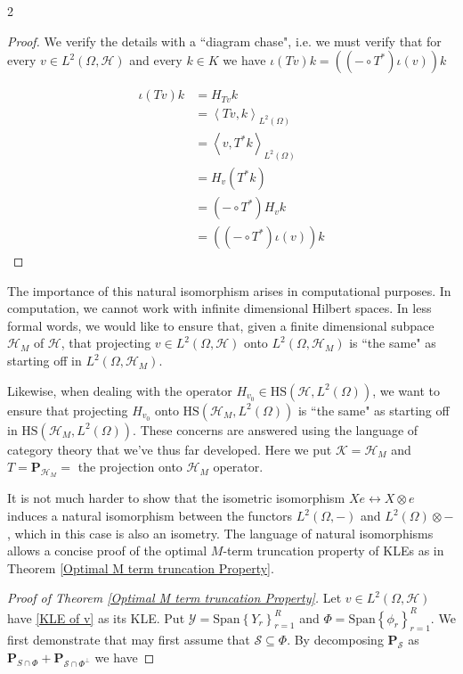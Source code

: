 \documentclass{article}
\numberwithin{theorem}{section}
\numberwithin{lemma}{section}
\numberwithin{definition}{section}
\numberwithin{assumption}{section}
\numberwithin{proposition}{section}
\numberwithin{remark}{section}
\numberwithin{corollary}{section}
\numberwithin{conjecture}{section}
\numberwithin{example}{section}
\newcommand{\bset}[1]{\left \lbrace #1 \right \rbrace}
\newcommand{\aset}[1]{\left \langle #1 \right \rangle}
\newcommand{\Span}[1]{\mathrm{Span}\bset{#1}}
\newcommand{\CH}{\mathcal H}
\begin{document}
\begin{multicols*}{2}
\begin{proof}
We verify the details with a ``diagram chase", i.e. we must verify that for every $v \in L^2(\Omega, \mathcal H)$ and every $k \in K$ we have $\iota(Tv)k = ((-\circ T^*)\iota(v))k$

\begin{align*}
    \iota(Tv)k &= H_{Tv}k
    \\&= 
    \aset{Tv, k}_{L^2(\Omega)}
    \\&= 
    \aset{v, T^*k}_{L^2(\Omega)}
    \\&=
    H_v(T^*k)
    \\&=
    (-\circ T^*)H_vk
    \\&=
    ((-\circ T^*)\iota(v))k
\end{align*}
\end{proof}

The importance of this natural isomorphism arises in computational purposes. In computation, we cannot work with infinite dimensional Hilbert spaces. In less formal words, we would like to ensure that, given a finite dimensional subpace $\mathcal H_M$ of $\mathcal H$, that projecting $v \in L^2(\Omega, \mathcal H)$ onto $L^2(\Omega, \mathcal H_M)$ is ``the same" as starting off in $L^2(\Omega, \mathcal H_M)$. 

Likewise, when dealing with the operator $H_{v_0} \in \text{HS}(\mathcal H, L^2(\Omega))$, we want to ensure that projecting $H_{v_0}$ onto $\text{HS}(\mathcal H_M, L^2(\Omega))$ is ``the same" as starting off in $\text{HS}(\mathcal H_M, L^2(\Omega))$. These concerns are answered using the language of category theory that we've thus far developed. Here we put $\mathcal K = \mathcal H_M$ and $T = \mathbf P_{\mathcal H_M} = $ the projection onto $\mathcal H_M$ operator.  

It is not much harder to show that the isometric isomorphism $Xe \leftrightarrow X \otimes e$ induces a natural isomorphism between the functors $L^2(\Omega, -)$ and $L^2(\Omega) \otimes -$, which in this case is also an isometry. The language of natural isomorphisms allows a concise proof of the optimal $M$-term truncation property of KLEs as in Theorem \ref{Optimal M term truncation Property}. 


\begin{proof}[Proof of Theorem \ref{Optimal M term truncation Property}]
	Let $v \in L^2(\Omega, \CH)$ have \eqref{KLE of v} as its KLE. Put $\mathcal Y = \Span{Y_r}_{r=1}^R$ and $\Phi = \Span{\phi_r}_{r=1}^R$. We first demonstrate that may first assume that $\mathcal S \subseteq \Phi$. By decomposing $\mathbf P_\mathcal S$ as $\mathbf P_{S \cap \Phi} + \mathbf P_{\mathcal S \cap \Phi^\perp}$ we have 
	

\end{proof}
\end{multicols*}
\end{document}
